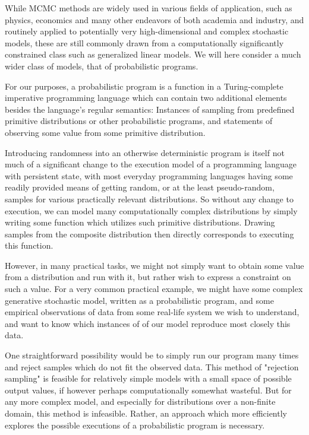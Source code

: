 While MCMC methods are widely used in various fields of application, such as physics, economics and many other endeavors of both academia and industry, and routinely applied to potentially very high-dimensional and complex stochastic models, these are still commonly drawn from a computationally significantly constrained class such as generalized linear models. We will here consider a much wider class of models, that of probabilistic programs.

For our purposes, a probabilistic program is a function in a Turing-complete imperative programming language which can contain two additional elements besides the language's regular semantics: Instances of sampling from predefined primitive distributions or other probabilistic programs, and statements of observing some value from some primitive distribution.

Introducing randomness into an otherwise deterministic program is itself not much of a significant change to the execution model of a programming language with persistent state, with most everyday programming languages having some readily provided means of getting random, or at the least pseudo-random, samples for various practically relevant distributions. So without any change to execution, we can model many computationally complex distributions by simply writing some function which utilizes such primitive distributions. Drawing samples from the composite distribution then directly corresponds to executing this function.

However, in many practical tasks, we might not simply want to obtain some value from a distribution and run with it, but rather wish to express a constraint on such a value. For a very common practical example, we might have some complex generative stochastic model, written as a probabilistic program, and some empirical observations of data from some real-life system we wish to understand, and want to know which instances of of our model reproduce most closely this data.

One straightforward possibility would be to simply run our program many times and reject samples which do not fit the observed data. This method of "rejection sampling" is feasible for relatively simple models with a small space of possible output values, if however perhaps computationally somewhat wasteful. But for any more complex model, and especially for distributions over a non-finite domain, this method is infeasible. Rather, an approach which more efficiently explores the possible executions of a probabilistic program is necessary.

